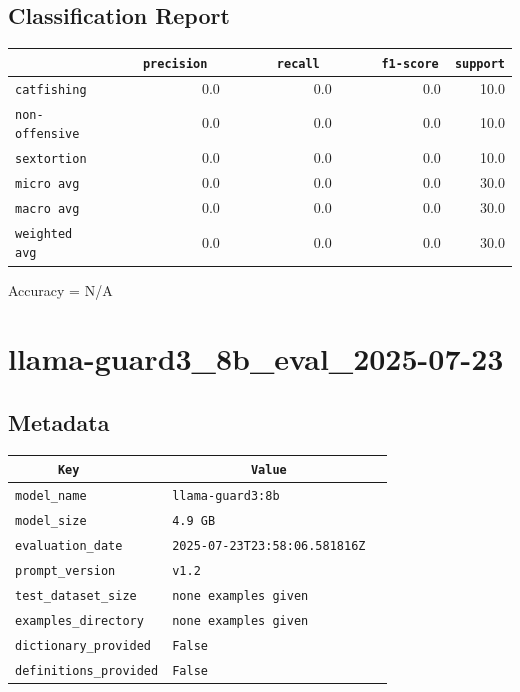 \documentclass{article}
\begin{document}
\subsection{Classification Report}

\begin{center}
\begin{tabular}{l | r | r | r | r} \hline
    \verb|            | & \verb|    precision     | & \verb|      recall      | & \verb|     f1-score     | & \verb|support| \\ \hline
    \hline
    \verb|catfishing | & 0.0 & 0.0 & 0.0 &    10.0 \\ \hline
    \verb|non-offensive| & 0.0 & 0.0 & 0.0 &    10.0 \\ \hline
    \verb|sextortion | & 0.0 & 0.0 & 0.0 &    10.0 \\ \hline
    \verb|micro avg  | & 0.0 & 0.0 & 0.0 &    30.0 \\ \hline
    \verb|macro avg  | & 0.0 & 0.0 & 0.0 &    30.0 \\ \hline
    \verb|weighted avg| & 0.0 & 0.0 & 0.0 &    30.0 \\ \hline
\end{tabular}
\end{center}

\begin{center}
Accuracy = N/A
\end{center}

\section{llama-guard3\_8b\_eval\_2025-07-23}
\subsection{Metadata}

\begin{center}
\begin{tabular}{l | l} \hline
    \verb|      Key      | & \verb|           Value           | \\ \hline
    \hline
    \verb|model_name    | & \verb|llama-guard3:8b              | \\ \hline
    \verb|model_size    | & \verb|4.9 GB                       | \\ \hline
    \verb|evaluation_date| & \verb|2025-07-23T23:58:06.581816Z  | \\ \hline
    \verb|prompt_version| & \verb|v1.2                         | \\ \hline
    \verb|test_dataset_size| & \verb|none examples given          | \\ \hline
    \verb|examples_directory| & \verb|none examples given          | \\ \hline
    \verb|dictionary_provided| & \verb|False                        | \\ \hline
    \verb|definitions_provided| & \verb|False                        | \\ \hline
\end{tabular}
\end{center}
\end{document}
